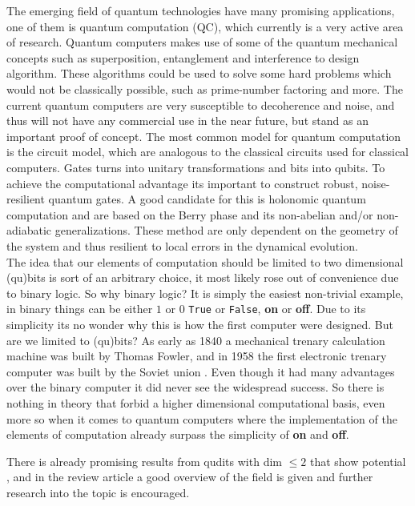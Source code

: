 The emerging field of quantum technologies have many promising applications, one of them is quantum computation (QC), which currently is a very active area of research. Quantum computers makes use of some of the quantum mechanical concepts such as superposition, entanglement and interference to design algorithm. These algorithms could be used to solve some hard problems which would not be classically possible, such as prime-number factoring\cite{shor} and more\cite{Grover}. The current quantum computers are very susceptible to decoherence and noise, and thus will not have any commercial use in the near future, but stand as an important proof of concept. 
The most common model for quantum computation is the circuit model, which are analogous to the classical circuits used for classical computers. Gates turns into unitary transformations and bits into qubits. To achieve the computational advantage its important to construct robust, noise-resilient quantum gates. A good candidate for this is holonomic quantum computation\cite{HQC}\cite{NHQC} and are based on the Berry phase\cite{berry} and its non-abelian and/or non-adiabatic generalizations\cite{anandan1}\cite{anandan2}\cite{zee}. These method are only dependent on the geometry of the system and thus resilient to local errors in the dynamical evolution.
\\
The idea that our elements of computation should be limited to two dimensional (qu)bits is sort of an arbitrary choice, it most likely rose out of convenience due to binary logic. So why binary logic? It is simply the easiest non-trivial example, in binary things can be either $1$ or $0$ {\tt True} or {\tt False}, \textbf{on} or \textbf{off}. Due to its simplicity its no wonder why this is how the first computer were designed. But are we limited to (qu)bits? As early as 1840 a mechanical trenary calculation machine was built by Thomas Fowler, and in 1958 the first electronic trenary computer was built by the Soviet union . Even though it had many advantages over the binary computer it did never see the widespread success. So there is nothing in theory that forbid a higher dimensional computational basis, even more so when it comes to quantum computers where the implementation of the elements of computation already surpass the simplicity of \textbf{on} and \textbf{off}. 

There is already promising results from qudits with dim $\leq 2$ that show potential \cite{qutrit1}\cite{qudit2}\cite{qudit3}, and in the review article \cite{qudit} a good overview of the field is given and further research into the topic is encouraged. 

